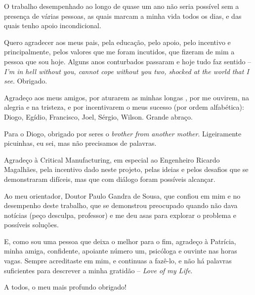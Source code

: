 \begin{acknowledgements}

O trabalho desempenhado ao longo de quase um ano não seria possível sem a presença de várias pessoas, as quais marcam a minha vida todos os dias, e das quais tenho apoio incondicional.

Quero agradecer aos meus pais, pela educação, pelo apoio, pelo incentivo e principalmente, pelos valores que me foram incutidos, que fizeram de mim a pessoa que sou hoje. Alguns anos conturbados passaram e hoje tudo faz sentido -- \textit{I'm in hell without you, cannot cope without you two, shocked at the world that I see}. Obrigado.

Agradeço aos meus amigos, por aturarem as minhas longas , por me ouvirem, na alegria e na tristeza, e por incentivarem o meus sucesso (por ordem alfabética): Diogo, Egídio, Francisco, Joel, Sérgio, Wilson. Grande abraço.

Para o Diogo, obrigado por seres o \textit{brother from another mother}. Ligeiramente picuinhas, eu sei, mas não precisamos de palavras.

Agradeço à Critical Manufacturing, em especial ao Engenheiro Ricardo Magalhães, pela incentivo dado neste projeto, pelas ideias e pelos desafios que se demonstraram difíceis, mas que com diálogo foram possíveis alcançar.

Ao meu orientador, Doutor Paulo Gandra de Sousa, que confiou em mim e no desempenho deste trabalho, que se demonstrou preocupado quando não dava notícias (peço desculpa, professor) e me deu asas para explorar o problema e possíveis soluções.

E, como sou uma pessoa que deixa o melhor para o fim, agradeço à Patrícia, minha amiga, confidente, apoiante número um, psicóloga e ouvinte nas horas vagas. Sempre acreditaste em mim, e continuas a fazê-lo, e não há palavras suficientes para descrever a minha gratidão -- \textit{Love of my Life}.

A todos, o meu mais profundo obrigado!
\end{acknowledgements}